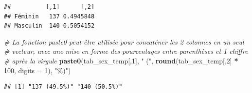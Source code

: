 \documentclass[
]{book}
\newenvironment{Shaded}{\begin{snugshade}}{\end{snugshade}}
\newcommand{\AttributeTok}[1]{\textcolor[rgb]{0.13,0.29,0.53}{#1}}
\newcommand{\CommentTok}[1]{\textcolor[rgb]{0.56,0.35,0.01}{\textit{#1}}}
\newcommand{\DecValTok}[1]{\textcolor[rgb]{0.00,0.00,0.81}{#1}}
\newcommand{\FunctionTok}[1]{\textcolor[rgb]{0.13,0.29,0.53}{\textbf{#1}}}
\newcommand{\NormalTok}[1]{#1}
\newcommand{\OtherTok}[1]{\textcolor[rgb]{0.56,0.35,0.01}{#1}}
\newcommand{\SpecialCharTok}[1]{\textcolor[rgb]{0.81,0.36,0.00}{\textbf{#1}}}
\newcommand{\StringTok}[1]{\textcolor[rgb]{0.31,0.60,0.02}{#1}}
\begin{document}
\begin{Shaded}
\end{Shaded}

\begin{verbatim}
##          [,1]      [,2]
## Féminin   137 0.4945848
## Masculin  140 0.5054152
\end{verbatim}

\begin{Shaded}
\begin{Highlighting}[]
\CommentTok{\# La fonction paste0 peut être utilisée pour concaténer les 2 colonnes en un seul }
\CommentTok{\# vecteur, avec une mise en forme des pourcentages entre parenthèses et 1 chiffre}
\CommentTok{\# après la virgule}
\FunctionTok{paste0}\NormalTok{(tab\_sex\_temp[,}\DecValTok{1}\NormalTok{], }\StringTok{" ("}\NormalTok{, }\FunctionTok{round}\NormalTok{(tab\_sex\_temp[,}\DecValTok{2}\NormalTok{] }\SpecialCharTok{*} \DecValTok{100}\NormalTok{, }\AttributeTok{digits =} \DecValTok{1}\NormalTok{), }\StringTok{"\%)"}\NormalTok{)}
\end{Highlighting}
\end{Shaded}

\begin{verbatim}
## [1] "137 (49.5%)" "140 (50.5%)"
\end{verbatim}
\end{document}
